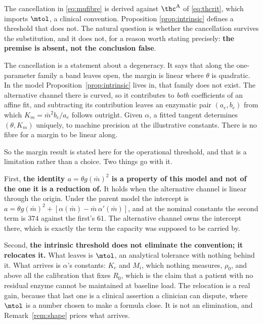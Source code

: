 \begin{remark}
\label{rem:which_threshold}
The cancellation in \eqref{eq:mufibre} is derived against $\thc^{\mathrm{A}}$ of
\eqref{eq:thcrit}, which imports $\mtol$, a clinical convention. Proposition
\ref{prop:intrinsic} defines a threshold that does not. The natural question is whether the
cancellation survives the substitution, and it does not, for a reason worth stating
precisely: \textbf{the premise is absent, not the conclusion false}.

The cancellation is a statement about a degeneracy. It says that along the one-parameter
family a band leaves open, the margin is linear where $\theta$ is quadratic. In the model
Proposition~\ref{prop:intrinsic} lives in, that family does not exist. The alternative
channel there is curved, so it contributes to \emph{both} coefficients of an affine fit, and
subtracting its contribution leaves an enzymatic pair $(a_e, b_e)$ from which
$K_m = \bar m^2 b_e/a_e$ follows outright. Given $\alpha$, a fitted tangent determines
$(\theta, K_m)$ uniquely, to machine precision at the illustrative constants. There is no
fibre for a margin to be linear along.

So the margin result is stated here for the operational threshold, and that is a limitation
rather than a choice. Two things go with it.

First, \textbf{the identity $a = \theta g(\bar m)^2$ is a property of this model and not of
the one it is a reduction of.} It holds when the alternative channel is linear through the
origin. Under the parent model the intercept is
$a = \theta g(\bar m)^2 + [\alpha(\bar m) - \bar m\,\alpha'(\bar m)]$, and at the nominal
constants the second term is $374$ against the first's $61$. The alternative channel owns
the intercept there, which is exactly the term the capacity was supposed to be carried by.

Second, \textbf{the intrinsic threshold does not eliminate the convention; it relocates
it.} What leaves is $\mtol$, an analytical tolerance with nothing behind it. What arrives is
$\alpha$'s constants: $K_c$ and $M_i$, which nothing measures, $\rho_0$, and above all the
calibration that fixes $R_0$, which is the claim that a patient with no residual enzyme
cannot be maintained at baseline load. The relocation is a real gain, because that last one
is a clinical assertion a clinician can dispute, where $\mtol$ is a number chosen to make a
formula close. It is not an elimination, and Remark~\ref{rem:shape} prices what arrives.
\end{remark}

